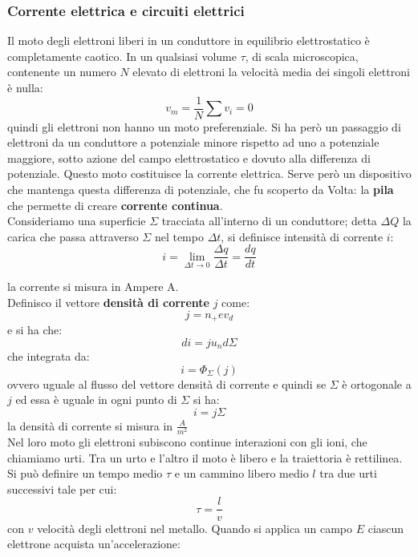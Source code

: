 \documentclass[a4paper,12pt, oneside]{book}
\begin{document}
\subsubsection{Corrente elettrica e circuiti elettrici}
Il moto degli elettroni liberi in un conduttore in equilibrio elettrostatico è completamente caotico. In un qualsiasi volume $\tau$, di scala microscopica, contenente un numero $N$ elevato di elettroni la velocità media dei singoli elettroni è nulla:
$$v_m=\frac{1}{N}\sum v_i=0$$
quindi gli elettroni non hanno un moto preferenziale. Si ha però un passaggio di elettroni da un conduttore a potenziale minore rispetto ad uno a potenziale maggiore, sotto azione del campo elettrostatico e dovuto alla differenza di potenziale. Questo moto costituisce la corrente elettrica. Serve però un dispositivo che mantenga questa differenza di potenziale, che fu scoperto da Volta: la \textbf{pila} che permette di creare \textbf{corrente continua}. \\
Consideriamo una superficie $\Sigma$ tracciata all'interno di un conduttore; detta $\Delta Q$ la carica che passa attraverso $\Sigma$ nel tempo $\Delta t$, si definisce intensità di corrente $i$:
$$i=\lim_{\Delta t\to 0}\frac{\Delta q}{\Delta t}=\frac{dq}{dt}$$

la corrente si misura in Ampere A.\\
Definisco il vettore \textbf{densità di corrente} $j$ come:
$$j=n_+ev_d$$
e si ha che:
$$di=ju_nd\Sigma$$
che integrata da:
$$i=\Phi_\Sigma(j)$$
ovvero uguale al flusso del vettore densità di corrente e quindi se $\Sigma$ è ortogonale a $j$ ed essa è uguale in ogni punto di $\Sigma$ si ha:
$$i=j\Sigma$$
la densità di corrente si misura in $\frac{A}{m^2}$
\\
Nel loro moto gli elettroni subiscono continue interazioni con gli ioni, che chiamiamo urti. Tra un urto e l'altro il moto è libero e la traiettoria è rettilinea. Si può definire un tempo medio $\tau$ e un cammino libero medio $l$ tra due urti successivi tale per cui:
$$\tau=\frac{l}{v}$$ 
con $v$ velocità degli elettroni nel metallo. Quando si applica un campo $E$ ciascun elettrone acquista un'accelerazione:
\end{document}

